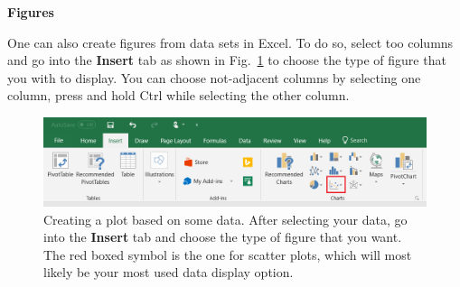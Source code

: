 \documentclass[12pt]{report}
\begin{document}
\begin{appendix}
\noindent \large \textbf{Figures} \normalsize

One can also create figures from data sets in Excel. To do so, select too columns and go into the \textbf{Insert} tab as shown in Fig.~\ref{Fig:Excel-fig-insert} to choose the type of figure that you with to display. You can choose not-adjacent columns by selecting one column, press and hold Ctrl while selecting the other column.
\begin{figure}[h]
\centering
\includegraphics[width=0.8 \textwidth]{Excel-fig-insert}
\caption{Creating a plot based on some data. After selecting your data, go into the \textbf{Insert} tab and choose the type of figure that you want. The red boxed symbol is the one for scatter plots, which will most likely be your most used data display option.}
\label{Fig:Excel-fig-insert}
\end{figure}


\end{appendix}
\end{document}
